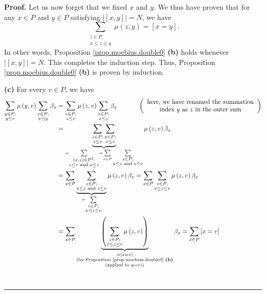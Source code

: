 \documentclass[numbers=enddot,12pt,final,onecolumn,notitlepage]{scrartcl}%
\theoremstyle{definition}
\newenvironment{proof}[1][Proof]{\noindent\textbf{#1.} }{\ \rule{0.5em}{0.5em}}
\newenvironment{verlong}{}{}
\let\sumnonlimits\sum
\renewcommand{\sum}{\sumnonlimits\limits}
\begin{document}
\begin{verlong}
\begin{proof}
Let us now forget that we fixed $x$ and $y$. We thus have proven that for any
$x\in P$ and $y\in P$ satisfying $\left\vert \left[  x,y\right]  \right\vert
=N$, we have%
\[
\sum_{\substack{z\in P;\\x\leq z\leq y}}\mu\left(  z,y\right)  =\left[
x=y\right]  .
\]
In other words, Proposition \ref{prop.moebius.double0} \textbf{(b)} holds
whenever $\left\vert \left[  x,y\right]  \right\vert =N$. This completes the
induction step. Thus, Proposition \ref{prop.moebius.double0} \textbf{(b)} is
proven by induction.

\textbf{(c)} For every $v\in P$, we have%
\begin{align*}
\sum_{\substack{y\in P;\\y\leq v}}\mu\left(  y,v\right)  \sum_{\substack{x\in
P;\\x\leq y}}\beta_{x}  &  =\sum_{\substack{z\in P;\\z\leq v}}\mu\left(
z,v\right)  \sum_{\substack{x\in P;\\x\leq z}}\beta_{x}%
\ \ \ \ \ \ \ \ \ \ \left(
\begin{array}
[c]{c}%
\text{here, we have renamed the summation}\\
\text{index }y\text{ as }z\text{ in the outer sum}%
\end{array}
\right) \\
&  =\underbrace{\sum_{\substack{z\in P;\\z\leq v}}\sum_{\substack{x\in
P;\\x\leq z}}}_{=\sum_{\substack{\left(  x,z\right)  \in P^{2};\\z\leq v\text{
and }x\leq z}}=\sum_{x\in P}\sum_{\substack{z\in P;\\x\leq z\text{ and }z\leq
v}}}\mu\left(  z,v\right)  \beta_{x}\\
&  =\sum_{x\in P}\underbrace{\sum_{\substack{z\in P;\\x\leq z\text{ and }z\leq
v}}}_{=\sum_{\substack{z\in P;\\x\leq z\leq v}}}\mu\left(  z,v\right)
\beta_{x}=\sum_{x\in P}\sum_{\substack{z\in P;\\x\leq z\leq v}}\mu\left(
z,v\right)  \beta_{x}\\
&  =\sum_{x\in P}\underbrace{\left(  \sum_{\substack{z\in P;\\x\leq z\leq
v}}\mu\left(  z,v\right)  \right)  }_{\substack{=\left[  x=v\right]
\\\text{(by Proposition \ref{prop.moebius.double0} \textbf{(b)}}%
\\\text{(applied to }y=v\text{))}}}\beta_{x}=\sum_{x\in P}\left[  x=v\right]

\end{align*}
\end{proof}
\end{verlong}
\end{document}
